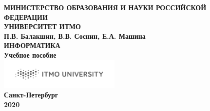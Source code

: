 \documentclass[a5paper,14pt]{report}
\begin{document}
\pagestyle{empty}
\newpage
\mbox{}
\newpage
\begin{center}
\scriptsize
\textbf {
МИНИСТЕРСТВО ОБРАЗОВАНИЯ И НАУКИ РОССИЙСКОЙ ФЕДЕРАЦИИ
\newline
\\УНИВЕРСИТЕТ ИТМО
\large
\\\vspace{4cm}
П.В. Балакшин, В.В. Соснин, Е.А. Машина
\\\vspace{1cm}
\LARGE
ИНФОРМАТИКА
\Large
\\\vspace{1cm}
Учебное пособие
\\\vspace{6cm}
\includegraphics[width=6cm]{ITMO_log}
\\\vspace{0.5cm}
\normalsize
Санкт-Петербург
\\2020
}
\end{center}
\end{document}
